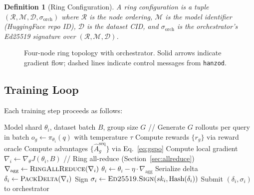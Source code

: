 \documentclass[11pt,letterpaper]{article}
\newtheorem{definition}{Definition}[section]
\newcommand{\GYM}{\textsc{Gym}}
\begin{document}
\begin{definition}[Ring Configuration]
A ring configuration is a tuple $(\mathcal{R}, \mathcal{M}, \mathcal{D}, \sigma_{\text{orch}})$ where $\mathcal{R}$ is the node ordering, $\mathcal{M}$ is the model identifier (HuggingFace repo ID), $\mathcal{D}$ is the dataset CID, and $\sigma_{\text{orch}}$ is the orchestrator's Ed25519 signature over $(\mathcal{R}, \mathcal{M}, \mathcal{D})$.
\end{definition}

\begin{figure}[t]
\centering
{}
\caption{Four-node ring topology with orchestrator. Solid arrows indicate gradient flow; dashed lines indicate control messages from \texttt{hanzod}.}
\label{fig:ring}
\end{figure}

\subsection{Training Loop}

Each training step proceeds as follows:

\begin{algorithm}[t]
\caption{\GYM{} Training Step (per node $v_i$)}
\label{alg:train-step}
\begin{algorithmic}[1]
\REQUIRE Model shard $\theta_i$, dataset batch $B$, group size $G$
\STATE // Generate $G$ rollouts per query in batch
        \STATE $o_g \leftarrow \pi_{\theta_i}(q)$ with temperature $\tau$
    \ENDFOR
    \STATE Compute rewards $\{r_g\}$ via reward oracle
    \STATE Compute advantages $\{\hat{A}_g^{\text{seq}}\}$ via Eq.~\ref{eq:gspo}
\ENDFOR
\STATE Compute local gradient $\nabla_i \leftarrow \nabla_\theta J(\theta_i, B)$
\STATE // Ring all-reduce (Section~\ref{sec:allreduce})
\STATE $\nabla_{\text{agg}} \leftarrow \textsc{RingAllReduce}(\nabla_i)$
\STATE $\theta_i \leftarrow \theta_i - \eta \cdot \nabla_{\text{agg}}$
\STATE Serialize delta $\delta_i \leftarrow \textsc{PackDelta}(\nabla_i)$
\STATE Sign $\sigma_i \leftarrow \textsc{Ed25519.Sign}(sk_i, \text{Hash}(\delta_i))$
\STATE Submit $(\delta_i, \sigma_i)$ to orchestrator
\end{algorithmic}
\end{algorithm}
\end{document}
